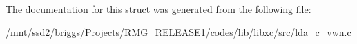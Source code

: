 The documentation for this struct was generated from the following file\-:\begin{DoxyCompactItemize}
\item 
/mnt/ssd2/briggs/\-Projects/\-R\-M\-G\-\_\-\-R\-E\-L\-E\-A\-S\-E1/codes/lib/libxc/src/\hyperlink{lda__c__vwn_8c}{lda\-\_\-c\-\_\-vwn.\-c}\end{DoxyCompactItemize}
